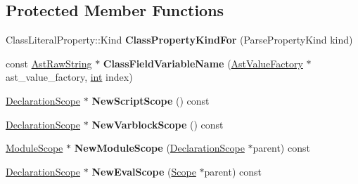 \subsection*{Protected Member Functions}
\begin{DoxyCompactItemize}
\item 
\mbox{\label{classv8_1_1internal_1_1ParserBase_af468bf9f543df1034e6cc33e73963f66}} 
Class\+Literal\+Property\+::\+Kind {\bfseries Class\+Property\+Kind\+For} (Parse\+Property\+Kind kind)
\item 
\mbox{\label{classv8_1_1internal_1_1ParserBase_a6de483c1920abab28b588cdbda8fb3a5}} 
const \mbox{\hyperlink{classv8_1_1internal_1_1AstRawString}{Ast\+Raw\+String}} $\ast$ {\bfseries Class\+Field\+Variable\+Name} (\mbox{\hyperlink{classv8_1_1internal_1_1AstValueFactory}{Ast\+Value\+Factory}} $\ast$ast\+\_\+value\+\_\+factory, \mbox{\hyperlink{classint}{int}} index)
\item 
\mbox{\label{classv8_1_1internal_1_1ParserBase_a06e72b444caf0b8fa738e1216ea7b551}} 
\mbox{\hyperlink{classv8_1_1internal_1_1DeclarationScope}{Declaration\+Scope}} $\ast$ {\bfseries New\+Script\+Scope} () const
\item 
\mbox{\label{classv8_1_1internal_1_1ParserBase_aaee3c6088b7c00dea6f325392923a790}} 
\mbox{\hyperlink{classv8_1_1internal_1_1DeclarationScope}{Declaration\+Scope}} $\ast$ {\bfseries New\+Varblock\+Scope} () const
\item 
\mbox{\label{classv8_1_1internal_1_1ParserBase_a7afa289157955523c744f2980647e697}} 
\mbox{\hyperlink{classv8_1_1internal_1_1ModuleScope}{Module\+Scope}} $\ast$ {\bfseries New\+Module\+Scope} (\mbox{\hyperlink{classv8_1_1internal_1_1DeclarationScope}{Declaration\+Scope}} $\ast$parent) const
\item 
\mbox{\label{classv8_1_1internal_1_1ParserBase_a98e622b80cba29f19dfb447e47f75e50}} 
\mbox{\hyperlink{classv8_1_1internal_1_1DeclarationScope}{Declaration\+Scope}} $\ast$ {\bfseries New\+Eval\+Scope} (\mbox{\hyperlink{classv8_1_1internal_1_1Scope}{Scope}} $\ast$parent) const
\item 

\end{DoxyCompactItemize}
